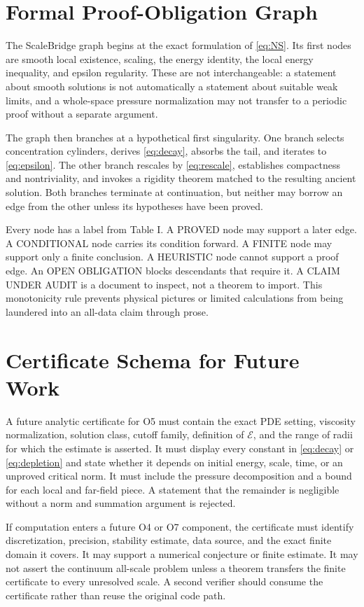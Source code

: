 \documentclass[conference]{../../../../Conference-LaTeX-template_10-17-19/IEEEtran}
\begin{document}
\appendices
\section{Formal Proof-Obligation Graph}
The ScaleBridge graph begins at the exact formulation of \eqref{eq:NS}. Its first nodes are smooth local existence, scaling, the energy identity, the local energy inequality, and epsilon regularity. These are not interchangeable: a statement about smooth solutions is not automatically a statement about suitable weak limits, and a whole-space pressure normalization may not transfer to a periodic proof without a separate argument.

The graph then branches at a hypothetical first singularity. One branch selects concentration cylinders, derives \eqref{eq:decay}, absorbs the tail, and iterates to \eqref{eq:epsilon}. The other branch rescales by \eqref{eq:rescale}, establishes compactness and nontriviality, and invokes a rigidity theorem matched to the resulting ancient solution. Both branches terminate at continuation, but neither may borrow an edge from the other unless its hypotheses have been proved.

Every node has a label from Table I. A PROVED node may support a later edge. A CONDITIONAL node carries its condition forward. A FINITE node may support only a finite conclusion. A HEURISTIC node cannot support a proof edge. An OPEN OBLIGATION blocks descendants that require it. A CLAIM UNDER AUDIT is a document to inspect, not a theorem to import. This monotonicity rule prevents physical pictures or limited calculations from being laundered into an all-data claim through prose.

\section{Certificate Schema for Future Work}
A future analytic certificate for O5 must contain the exact PDE setting, viscosity normalization, solution class, cutoff family, definition of $\mathcal E$, and the range of radii for which the estimate is asserted. It must display every constant in \eqref{eq:decay} or \eqref{eq:depletion} and state whether it depends on initial energy, scale, time, or an unproved critical norm. It must include the pressure decomposition and a bound for each local and far-field piece. A statement that the remainder is negligible without a norm and summation argument is rejected.

If computation enters a future O4 or O7 component, the certificate must identify discretization, precision, stability estimate, data source, and the exact finite domain it covers. It may support a numerical conjecture or finite estimate. It may not assert the continuum all-scale problem unless a theorem transfers the finite certificate to every unresolved scale. A second verifier should consume the certificate rather than reuse the original code path.
\end{document}

